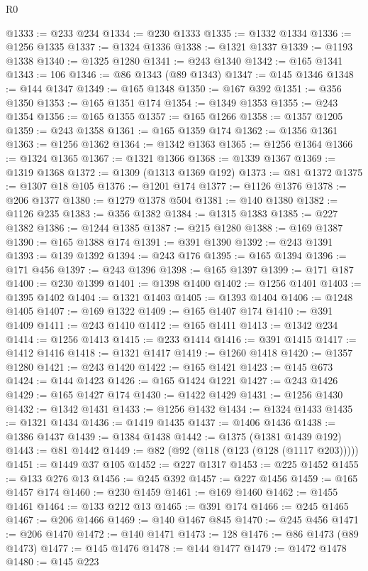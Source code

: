 \begin{lexlean}{R0}
\begin{coremodule}
@1333 := @233 @234
@1334 := @230 @1333
@1335 := @1332 @1334
@1336 := @1256 @1335
@1337 := @1324 @1336
@1338 := @1321 @1337
@1339 := @1193 @1338
@1340 := @1325 @1280
@1341 := @243 @1340
@1342 := @165 @1341
@1343 := 106
@1346 := @86 @1343 (@89 @1343)
@1347 := @145 @1346
@1348 := @144 @1347
@1349 := @165 @1348
@1350 := @167 @392
@1351 := @356 @1350
@1353 := @165 @1351 @174
@1354 := @1349 @1353
@1355 := @243 @1354
@1356 := @165 @1355
@1357 := @165 @1266
@1358 := @1357 @1205
@1359 := @243 @1358
@1361 := @165 @1359 @174
@1362 := @1356 @1361
@1363 := @1256 @1362
@1364 := @1342 @1363
@1365 := @1256 @1364
@1366 := @1324 @1365
@1367 := @1321 @1366
@1368 := @1339 @1367
@1369 := @1319 @1368
@1372 := @1309 (@1313 @1369 @192)
@1373 := @81 @1372
@1375 := @1307 @18 @105
@1376 := @1201 @174
@1377 := @1126 @1376
@1378 := @206 @1377
@1380 := @1279 @1378 @504
@1381 := @140 @1380
@1382 := @1126 @235
@1383 := @356 @1382
@1384 := @1315 @1383
@1385 := @227 @1382
@1386 := @1244 @1385
@1387 := @215 @1280
@1388 := @169 @1387
@1390 := @165 @1388 @174
@1391 := @391 @1390
@1392 := @243 @1391
@1393 := @139 @1392
@1394 := @243 @176
@1395 := @165 @1394
@1396 := @171 @456
@1397 := @243 @1396
@1398 := @165 @1397
@1399 := @171 @187
@1400 := @230 @1399
@1401 := @1398 @1400
@1402 := @1256 @1401
@1403 := @1395 @1402
@1404 := @1321 @1403
@1405 := @1393 @1404
@1406 := @1248 @1405
@1407 := @169 @1322
@1409 := @165 @1407 @174
@1410 := @391 @1409
@1411 := @243 @1410
@1412 := @165 @1411
@1413 := @1342 @234
@1414 := @1256 @1413
@1415 := @233 @1414
@1416 := @391 @1415
@1417 := @1412 @1416
@1418 := @1321 @1417
@1419 := @1260 @1418
@1420 := @1357 @1280
@1421 := @243 @1420
@1422 := @165 @1421
@1423 := @145 @673
@1424 := @144 @1423
@1426 := @165 @1424 @1221
@1427 := @243 @1426
@1429 := @165 @1427 @174
@1430 := @1422 @1429
@1431 := @1256 @1430
@1432 := @1342 @1431
@1433 := @1256 @1432
@1434 := @1324 @1433
@1435 := @1321 @1434
@1436 := @1419 @1435
@1437 := @1406 @1436
@1438 := @1386 @1437
@1439 := @1384 @1438
@1442 := @1375 (@1381 @1439 @192)
@1443 := @81 @1442
@1449 := @82 (@92 (@118 (@123 (@128 (@1117 @203)))))
@1451 := @1449 @37 @105
@1452 := @227 @1317
@1453 := @225 @1452
@1455 := @133 @276 @13
@1456 := @245 @392
@1457 := @227 @1456
@1459 := @165 @1457 @174
@1460 := @230 @1459
@1461 := @169 @1460
@1462 := @1455 @1461
@1464 := @133 @212 @13
@1465 := @391 @174
@1466 := @245 @1465
@1467 := @206 @1466
@1469 := @140 @1467 @845
@1470 := @245 @456
@1471 := @206 @1470
@1472 := @140 @1471
@1473 := 128
@1476 := @86 @1473 (@89 @1473)
@1477 := @145 @1476
@1478 := @144 @1477
@1479 := @1472 @1478
@1480 := @145 @223

\end{coremodule}
\end{lexlean}
